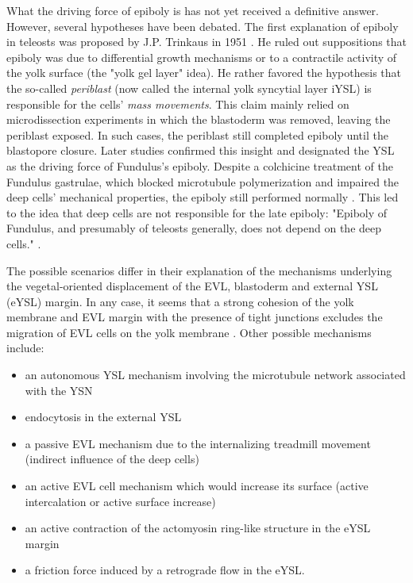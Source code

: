 What the driving force of epiboly is has not yet received a definitive answer. However, several hypotheses have been debated. The first explanation of epiboly in teleosts was proposed by J.P. Trinkaus in 1951 \cite{Trinkaus:1951ue}. He ruled out suppositions that epiboly was due to differential growth mechanisms or to a contractile activity of the yolk surface (the "yolk gel layer" idea). He rather favored the hypothesis that the so-called \textit{periblast} (now called the internal yolk syncytial layer iYSL) is responsible for the cells' \textit{mass movements}. This claim mainly relied on microdissection experiments in which the blastoderm was removed, leaving the periblast exposed. In such cases, the periblast still completed epiboly until the blastopore closure. Later studies \cite{Trinkaus:1967uz}\cite{Trinkaus:1984wu} confirmed this insight and designated the YSL as the driving force of Fundulus's epiboly. Despite a colchicine treatment of the Fundulus gastrulae, which blocked microtubule polymerization and impaired the deep cells' mechanical properties, the epiboly still performed normally \cite{Trinkaus:1983bm}. This led to the idea that deep cells are not responsible for the late epiboly: "Epiboly of Fundulus, and presumably of teleosts generally, does not depend on the deep cells." \cite{Trinkaus:1984wu}.

The possible scenarios differ in their explanation of the mechanisms underlying the vegetal-oriented displacement of the EVL, blastoderm and external YSL (eYSL) margin. In any case, it seems that a strong cohesion of the yolk membrane and EVL margin with the presence of tight junctions excludes the migration of EVL cells on the yolk membrane \cite{Betchaku:1978hm}. Other possible mechanisms include:
\begin{itemize}
	\item an autonomous YSL mechanism involving the microtubule network associated with the YSN
	\item endocytosis in the external YSL
	\item a passive EVL mechanism due to the internalizing treadmill movement (indirect influence of the deep cells)
	\item an active EVL cell mechanism which would increase its surface (active intercalation or active surface increase)
	\item an active contraction of the actomyosin ring-like structure in the eYSL margin
	\item a friction force induced by a retrograde flow in the eYSL.
\end{itemize}

